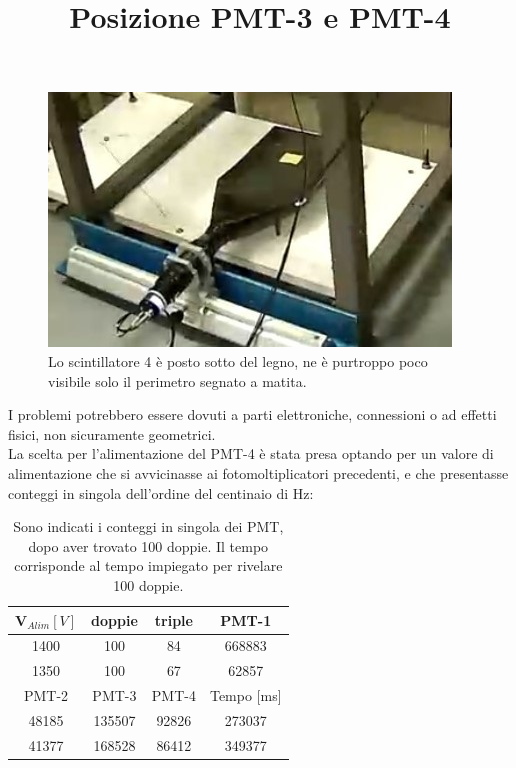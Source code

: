 \documentclass[a4paper,twocolumn]{article}
\begin{document}
\begin{figure}[ht]
\centering
\title{Posizione PMT-3 e PMT-4}
\begin{center}
\includegraphics[scale=0.4]{./immagini/TimeOfFlight/CalPMT4app.jpg}
\caption{Lo scintillatore 4 è posto sotto del legno, ne è purtroppo poco visibile solo il perimetro segnato a matita.}
\label{fig:PMT3posPMT4}
\end{center}
\end{figure}

I problemi potrebbero essere dovuti a parti elettroniche, connessioni o ad effetti fisici, non sicuramente geometrici.\\
La scelta per l'alimentazione del PMT-4 è stata presa optando per un valore di alimentazione che si avvicinasse ai fotomoltiplicatori precedenti, e che presentasse conteggi in singola dell'ordine del centinaio di Hz:

\begin{table}[H]
\begin{flushleft}
\begin{tabular}{|c|c|c|c|}
\hline
V$_{Alim} [V]$ & doppie & triple & PMT-1 \\
\hline
1400 & 100 & 84 & 668883 \\
\hline
1350 & 100 & 67 & 62857 \\
\hline
\hline
 PMT-2 &  PMT-3 &  PMT-4 & Tempo [ms]\\
\hline
48185 & 135507 & 92826 & 273037\\
\hline
41377 & 168528 & 86412 & 349377\\
\hline
\end{tabular}
\end{flushleft}
\caption{Sono indicati i conteggi in singola dei PMT, dopo aver trovato 100 doppie. Il tempo corrisponde al tempo impiegato per rivelare 100 doppie.}
\end{table}
\end{document}
